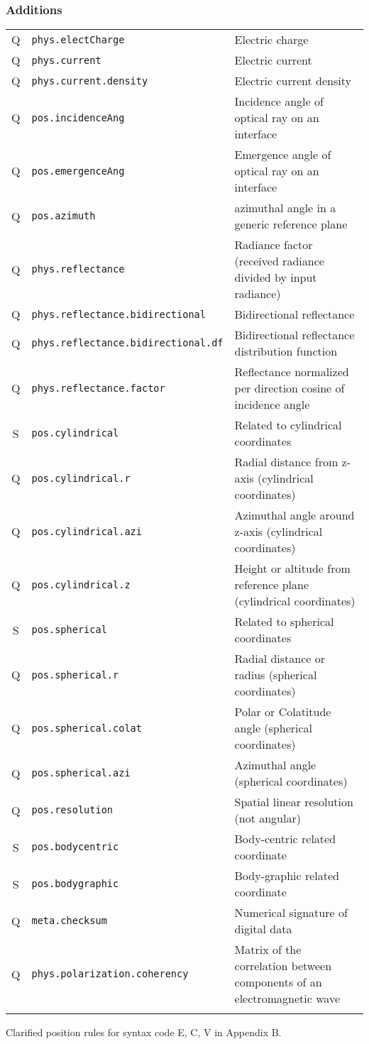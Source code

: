 \documentclass[11pt,a4paper]{ivoa}
\begin{document}
\subsubsection*{Additions}
\footnotesize\begin{longtable}[h!]{c|p{40ex}|p{}}
\sptablerule
Q & {\tt phys.electCharge} & Electric charge\\
Q & {\tt phys.current} & Electric current\\
Q & {\tt phys.current.density} & Electric current density\\
Q & {\tt pos.incidenceAng} & Incidence angle of optical ray on an interface\\
Q & {\tt pos.emergenceAng} & Emergence angle of optical ray on an interface\\
Q & {\tt pos.azimuth} & azimuthal angle in a generic reference plane\\
Q & {\tt phys.reflectance} & Radiance factor (received radiance divided by input radiance)\\
Q & {\tt phys.reflectance.bidirectional} & Bidirectional reflectance\\
Q & {\tt phys.reflectance.bidirectional.df} & Bidirectional reflectance distribution function\\
Q & {\tt phys.reflectance.factor} & Reflectance normalized per direction cosine of incidence angle\\
S & {\tt pos.cylindrical} & Related to cylindrical coordinates\\
Q & {\tt pos.cylindrical.r} & Radial distance from z-axis (cylindrical coordinates)\\
Q & {\tt pos.cylindrical.azi} & Azimuthal angle around z-axis (cylindrical coordinates)\\
Q & {\tt pos.cylindrical.z} & Height or altitude from reference plane (cylindrical coordinates)\\
S & {\tt pos.spherical} & Related to spherical coordinates\\
Q & {\tt pos.spherical.r} & Radial distance or radius (spherical coordinates)\\
Q & {\tt pos.spherical.colat} & Polar or Colatitude angle (spherical coordinates)\\
Q & {\tt pos.spherical.azi} & Azimuthal angle (spherical coordinates)\\
Q & {\tt pos.resolution} & Spatial linear resolution (not angular)\\
S & {\tt pos.bodycentric} & Body-centric related coordinate\\
S & {\tt pos.bodygraphic} & Body-graphic related coordinate\\
Q & {\tt meta.checksum} & Numerical signature of digital data\\
Q & {\tt phys.polarization.coherency} & Matrix of the correlation between components of an electromagnetic wave\\
\sptablerule
\end{longtable}
Clarified position rules for syntax code E, C, V in Appendix B.  
\end{document}
